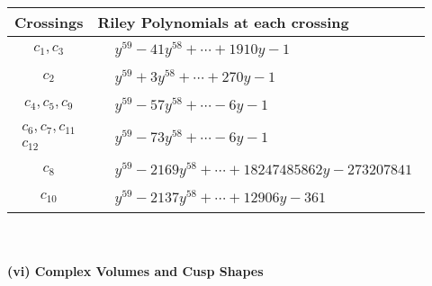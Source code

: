 \documentclass[1p]{elsarticle_modified}
\theoremstyle{definition}
\begin{document}
\begin{tabular}{m{50pt}|m{274pt}}
Crossings & \hspace{64pt}Riley Polynomials at each crossing \\
\hline $$\begin{aligned}c_{1},c_{3}\end{aligned}$$&$\begin{aligned}
&y^{59}-41 y^{58}+\cdots+1910 y-1
\end{aligned}$\\
\hline $$\begin{aligned}c_{2}\end{aligned}$$&$\begin{aligned}
&y^{59}+3 y^{58}+\cdots+270 y-1
\end{aligned}$\\
\hline $$\begin{aligned}c_{4},c_{5},c_{9}\end{aligned}$$&$\begin{aligned}
&y^{59}-57 y^{58}+\cdots-6 y-1
\end{aligned}$\\
\hline $$\begin{aligned}c_{6},c_{7},c_{11}\\c_{12}\end{aligned}$$&$\begin{aligned}
&y^{59}-73 y^{58}+\cdots-6 y-1
\end{aligned}$\\
\hline $$\begin{aligned}c_{8}\end{aligned}$$&$\begin{aligned}
&y^{59}-2169 y^{58}+\cdots+18247485862 y-273207841
\end{aligned}$\\
\hline $$\begin{aligned}c_{10}\end{aligned}$$&$\begin{aligned}
&y^{59}-2137 y^{58}+\cdots+12906 y-361
\end{aligned}$\\
\hline
\end{tabular}\\~\\
\newpage\flushleft \textbf{(vi) Complex Volumes and Cusp Shapes}
\end{document}
